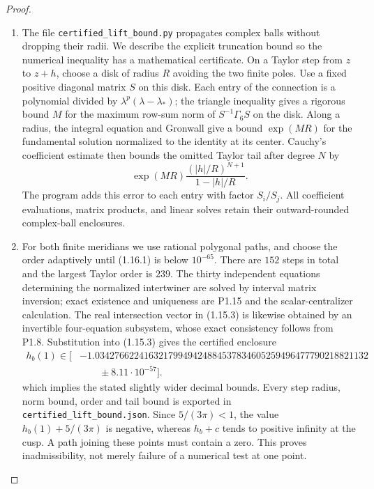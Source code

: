 \begin{proof}
\begin{enumerate}[label=\arabic*.]
\item The file \texttt{certified\_lift\_bound.py} propagates complex balls
without dropping their radii.  We describe the explicit truncation
bound so the numerical inequality has a mathematical certificate.
On a Taylor step from $z$ to $z+h$, choose a disk of radius $R$ avoiding
the two finite poles.  Use a fixed positive diagonal matrix $S$ on
this disk.  Each entry of the connection is a polynomial divided by
$\lambda^p(\lambda-\lambda_*)$; the triangle inequality gives a
rigorous bound $M$ for the maximum row-sum norm of
$S^{-1}\Gamma_6S$ on the disk.  Along a radius, the integral equation
and Gronwall give a bound $\exp(MR)$ for the fundamental solution
normalized to the identity at its center.  Cauchy's coefficient
estimate then bounds the omitted Taylor tail after degree $N$ by
\[
\exp(MR)\frac{(|h|/R)^{N+1}}{1-|h|/R}.
\tag{1.16.1}
\]
The program adds this error to each entry with factor $S_i/S_j$.
All coefficient evaluations, matrix products, and linear solves retain
their outward-rounded complex-ball enclosures.

\item For both finite meridians we use rational polygonal paths, and choose
the order adaptively until (1.16.1) is below $10^{-65}$.
There are $152$ steps in total and the largest Taylor order is $239$.
The thirty independent equations determining the normalized
intertwiner are solved by interval matrix inversion; exact existence
and uniqueness are P1.15 and the scalar-centralizer calculation.
The real intersection vector in (1.15.3) is likewise obtained by an
invertible four-equation subsystem, whose exact consistency follows
from P1.8.  Substitution into (1.15.3) gives the certified enclosure
\[
\begin{aligned}
h_b(1)\in\bigl[&
-1.03427662241632179949424884537834605259496477790218821132\\
&\qquad\mathbin{\pm}8.11\cdot10^{-57}\bigr].
\end{aligned}
\]
which implies the stated slightly wider decimal bounds.
Every step radius, norm bound, order and tail bound is exported in
\texttt{certified\_lift\_bound.json}.  Since $5/(3\pi)<1$, the value
$h_b(1)+5/(3\pi)$ is negative, whereas $h_b+c$ tends to positive
infinity at the cusp.  A path joining these points must contain a
zero.  This proves inadmissibility, not merely failure of a numerical
test at one point.


\end{enumerate}
\end{proof}
